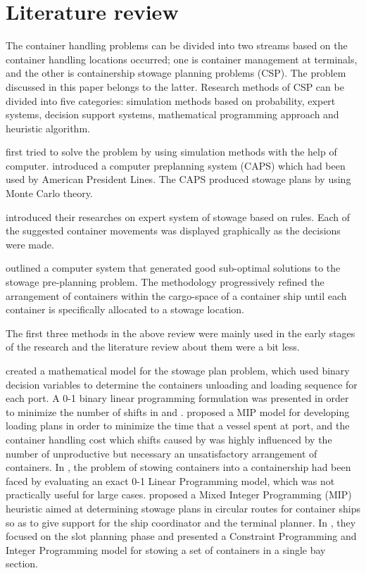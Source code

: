 \documentclass[review,3p,times,authoryear,12pt]{elsarticle}
\begin{document}
\section{Literature review}
\label{sec:lr}
The container handling problems can be divided into two streams based on the container handling locations occurred; one is container management at terminals, and the other is containership stowage planning problems (CSP).
The problem discussed in this paper belongs to the latter.
Research methods of CSP can be divided into five categories: simulation methods based on probability, expert systems, decision support systems, mathematical programming approach and heuristic algorithm.

\cite{webster1970container} first tried to solve the problem by using simulation methods with the help of computer.
\cite{shields1984containership} introduced a computer preplanning system (CAPS) which had been used by American President Lines.
The CAPS produced stowage plans by using Monte Carlo theory.

\cite{dillingham1986application} introduced their researches on expert system of stowage based on rules.
Each of the suggested container movements was displayed graphically as the decisions were made.

\cite{wilson2001container} outlined a computer system that generated good sub-optimal solutions to the stowage pre-planning problem.
The methodology progressively refined the arrangement of containers within the cargo-space of a container ship until each container is specifically allocated to a stowage location.

The first three methods in the above review were mainly used in the early stages of the research and the literature review about them were a bit less.

\cite{botter1991stowage} created a mathematical model for the stowage plan problem, which used binary decision variables to determine the containers unloading and loading sequence for each port.
A 0-1 binary linear programming formulation was presented in order to minimize the number of shifts in \cite{avriel1998stowage} and \cite{avriel2000container}.
\cite{haghani2001model} proposed a MIP model for developing loading plans in order to minimize the time that a vessel spent at port, and the container handling cost which shifts caused by was highly influenced by the number of unproductive but necessary an unsatisfactory arrangement of containers.
In \cite{ambrosino2004stowing}, the problem of stowing containers into a containership had been faced by evaluating an exact 0-1 Linear Programming model, which was not practically useful for large cases.
\cite{ambrosino2015mip} proposed a Mixed  Integer  Programming (MIP) heuristic aimed at determining stowage plans in circular routes for container ships so as to give support for the ship coordinator and the terminal planner.
In \cite{parreno2016grasp}, they focused on the slot planning phase and presented a Constraint Programming and Integer Programming model for stowing a set of containers in a single bay section.
\end{document}
